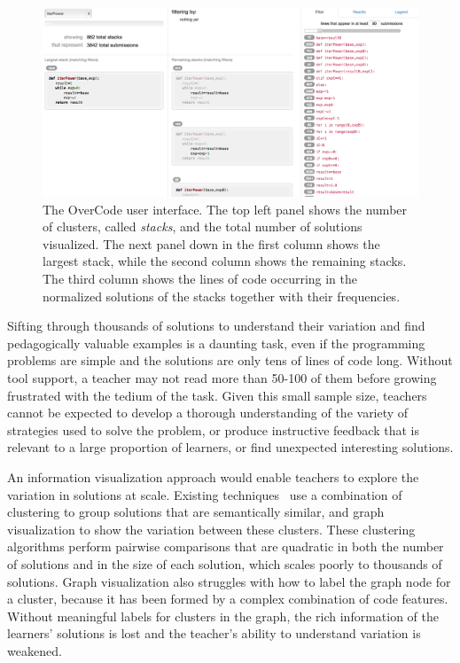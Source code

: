 \begin{figure}[t!]
\centering
\includegraphics[width=1.0\linewidth]{Body/figures/overcode/interfaceScreenShot.png}
\caption{The OverCode user interface. The top left panel shows the number of clusters, called {\it stacks}, and the total number of solutions visualized. The next panel down in the first column shows the largest stack, while the second column shows the remaining stacks. The third column shows the lines of code occurring in the normalized solutions of the stacks together with their frequencies.}
\label{overcode_fullinterface}
\end{figure}

Sifting through thousands of solutions to understand their variation and find pedagogically valuable examples is a daunting task, even if the programming problems are simple and the solutions are only tens of lines of code long. Without tool support, a teacher may not read more than 50-100 of them before growing frustrated with the tedium of the task. Given this small sample size, teachers cannot be expected to develop a thorough understanding of the variety of strategies used to solve the problem, or produce instructive feedback that is relevant to a large proportion of learners, or find unexpected interesting solutions.

An information visualization approach would enable teachers to explore the variation in solutions at scale. Existing techniques~\cite{gradingsigcse14,MOOCshop,codewebs} use a combination of clustering to group solutions that are semantically similar, and graph visualization to show the variation between these clusters. These clustering algorithms perform pairwise comparisons that are quadratic in both the number of solutions and in the size of each solution, which scales poorly to thousands of solutions. Graph visualization also struggles with how to label the graph node for a cluster, because it has been formed by a complex combination of code features. Without meaningful labels for clusters in the graph, the rich information of the learners' solutions is lost and the teacher's ability to understand variation is weakened.

